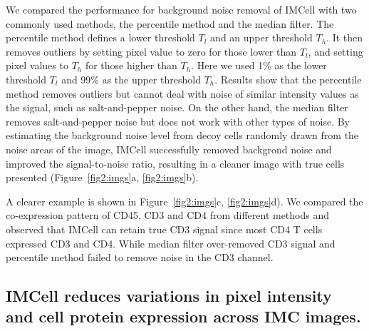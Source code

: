 \documentclass{mynature}
\begin{document}
We compared the performance for background noise removal of IMCell with two commonly used methods, the percentile method and the median filter. 
The percentile method defines a lower threshold $T_l$ and an upper threshold $T_h$. It then removes outliers by setting pixel value to zero for those lower than $T_l$, and setting pixel values to $T_h$ for those higher than $T_h$. Here we used 1\% as the lower threshold $T_l$ and 99\% as the upper threshold $T_h$. 
Results show that the percentile method removes outliers but cannot deal with noise of similar intensity values as the signal, such as salt-and-pepper noise. 
On the other hand, the median filter removes salt-and-pepper noise but does not work with other types of noise. 
By estimating the background noise level from decoy cells randomly drawn from the noise areas of the image, IMCell successfully removed backgrond noise and improved the signal-to-noise ratio, resulting in a cleaner image with true cells presented (Figure~\ref{fig2:imgs}a, \ref{fig2:imgs}b). 

A clearer example is shown in Figure~\ref{fig2:imgs}c, \ref{fig2:imgs}d). We compared the co-expression pattern of CD45, CD3 and CD4 from different methods and observed that IMCell can retain true CD3 signal since most CD4 T cells expressed CD3 and CD4. While median filter over-removed CD3 signal and percentile method failed to remove noise in the CD3 channel. 




\subsection{IMCell reduces variations in pixel intensity and cell protein expression across IMC images.}
\end{document}

